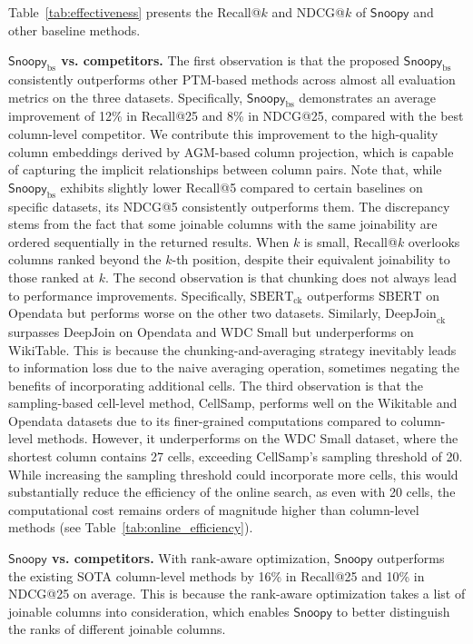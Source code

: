 Table~\ref{tab:effectiveness} presents the Recall@$k$ and NDCG@$k$ of $\textsf{Snoopy}$ and other baseline methods.

\noindent \textbf{$\textsf{Snoopy}_\text{bs}$ vs. competitors.}
The first observation is that the proposed $\textsf{Snoopy}_\text{bs}$ consistently outperforms other PTM-based methods across almost all evaluation metrics on the three datasets. 
Specifically, $\textsf{Snoopy}_\text{bs}$ demonstrates an average improvement of  12\% in Recall@25 and 8\% in NDCG@25, compared with the best column-level competitor. We contribute this improvement to the high-quality column embeddings derived by AGM-based column projection, which is capable of capturing the implicit relationships between column pairs. Note that, while $\textsf{Snoopy}_\text{bs}$ exhibits slightly lower Recall@5 compared to certain baselines on specific datasets, its NDCG@5 consistently outperforms them. The discrepancy stems from the fact that some joinable columns with the same joinability are ordered sequentially in the returned results. When $k$ is small, Recall@$k$ overlooks columns ranked beyond the $k$-th position, despite their equivalent joinability to those ranked at $k$. 
The second observation is that chunking does not always lead to performance improvements. Specifically, $\text{SBERT}_\text{ck}$ outperforms $\text{SBERT}$ on Opendata but performs worse on the other two datasets.  Similarly, $\text{DeepJoin}_\text{ck}$ surpasses $\text{DeepJoin}$ on Opendata and WDC Small but underperforms on WikiTable. This is because the chunking-and-averaging strategy inevitably leads to information loss due to the naive averaging operation, sometimes negating the benefits of incorporating additional cells.
The third observation is that the sampling-based cell-level method, CellSamp, performs well on the Wikitable and Opendata datasets due to its finer-grained computations compared to column-level methods.
However, it underperforms on the WDC Small dataset, where the shortest column contains 27 cells, exceeding CellSamp's sampling threshold of 20. While increasing the sampling threshold could incorporate more cells, this would substantially reduce the efficiency of the online search, as even with 20 cells, the computational cost remains orders of magnitude higher than column-level methods (see Table~\ref{tab:online_efficiency}). 
 
 

\noindent \textbf{$\textsf{Snoopy}$ vs. competitors.}
With rank-aware optimization, $\textsf{Snoopy}$ outperforms the existing SOTA column-level methods by  16\%  in Recall@25 and 10\% in NDCG@25 on average. This is because the rank-aware optimization takes a list of joinable columns into consideration, which enables $\textsf{Snoopy}$ to better distinguish the ranks of different joinable columns.
 

